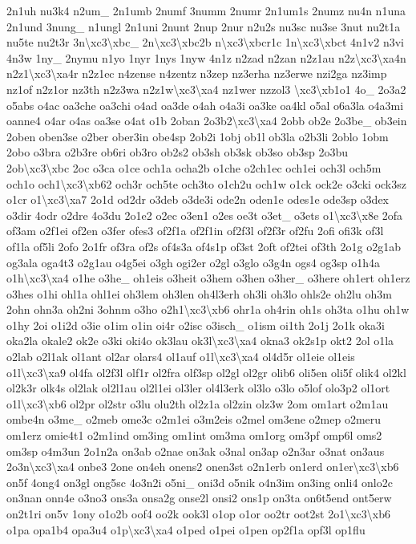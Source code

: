 {2n1uh nu3k4 n2um\-\_\- 2n1umb 2numf 3numm 2numr 2n1um1s 2numz nu4n n1una 2n1und 3nung\-\_\- n1ungl 2n1uni 2nunt 2nup 2nur n2u2s nu3sc nu3se 3nut nu2t1a nu5te nu2t3r 3n\textbackslash{}xc3\textbackslash{}xbc\-\_\- 2n\textbackslash{}xc3\textbackslash{}xbc2b n\textbackslash{}xc3\textbackslash{}xbcr1c 1n\textbackslash{}xc3\textbackslash{}xbct 4n1v2 n3vi 4n3w 1ny\-\_\- 2nymu n1yo 1nyr 1nys 1nyw 4n1z n2zad n2zan n2z1au n2z\textbackslash{}xc3\textbackslash{}xa4n n2z1\textbackslash{}xc3\textbackslash{}xa4r n2z1ec n4zense n4zentz n3zep nz3erha nz3erwe nzi2ga nz3imp nz1of n2z1or nz3th n2z3wa n2z1w\textbackslash{}xc3\textbackslash{}xa4 nz1wer nzzol3 \textbackslash{}xc3\textbackslash{}xb1o1 4o\-\_\- 2o3a2 o5abs o4ac oa3che oa3chi o4ad oa3de o4ah o4a3i oa3ke oa4kl o5al o6a3la o4a3mi oanne4 o4ar o4as oa3se o4at o1b 2oban 2o3b2\textbackslash{}xc3\textbackslash{}xa4 2obb ob2e 2o3be\-\_\- ob3ein 2oben oben3se o2ber ober3in obe4sp 2ob2i 1obj ob1l ob3la o2b3li 2oblo 1obm 2obo o3bra o2b3re ob6ri ob3ro ob2s2 ob3sh ob3sk ob3so ob3sp 2o3bu 2ob\textbackslash{}xc3\textbackslash{}xbc 2oc o3ca o1ce och1a ocha2b o1che o2ch1ec och1ei och3l och5m och1o och1\textbackslash{}xc3\textbackslash{}xb62 och3r och5te och3to o1ch2u och1w o1ck ock2e o3cki ock3sz o1cr o1\textbackslash{}xc3\textbackslash{}xa7 2o1d od2dr o3deb o3de3i ode2n oden1e odes1e ode3sp o3dex o3dir 4odr o2dre 4o3du 2o1e2 o2ec o3en1 o2es oe3t o3et\-\_\- o3ets o1\textbackslash{}xc3\textbackslash{}x8e 2ofa of3am o2f1ei of2en o3fer ofes3 of2f1a of2f1in of2f3l of2f3r of2fu 2ofi ofi3k of3l of1la of5li 2ofo 2o1fr of3ra of2s of4s3a of4s1p of3st 2oft of2tei of3th 2o1g o2g1ab og3ala oga4t3 o2g1au o4g5ei o3gh ogi2er o2gl o3glo o3g4n ogs4 og3sp o1h4a o1h\textbackslash{}xc3\textbackslash{}xa4 o1he o3he\-\_\- oh1eis o3heit o3hem o3hen o3her\-\_\- o3here oh1ert oh1erz o3hes o1hi ohl1a ohl1ei oh3lem oh3len oh4l3erh oh3li oh3lo ohls2e oh2lu oh3m 2ohn ohn3a oh2ni 3ohnm o3ho o2h1\textbackslash{}xc3\textbackslash{}xb6 ohr1a oh4rin oh1s oh3ta o1hu oh1w o1hy 2oi o1i2d o3ie o1im o1in oi4r o2isc o3isch\-\_\- o1ism oi1th 2o1j 2o1k oka3i oka2la okale2 ok2e o3ki oki4o ok3lau ok3l\textbackslash{}xc3\textbackslash{}xa4 okna3 ok2s1p okt2 2ol o1la o2lab o2l1ak ol1ant ol2ar olars4 ol1auf o1l\textbackslash{}xc3\textbackslash{}xa4 ol4d5r ol1eie ol1eis o1l\textbackslash{}xc3\textbackslash{}xa9 ol4fa ol2f3l olf1r ol2fra olf3sp ol2gl ol2gr olib6 oli5en oli5f olik4 ol2kl ol2k3r olk4s ol2lak ol2l1au ol2l1ei ol3ler ol4l3erk ol3lo o3lo o5lof olo3p2 ol1ort o1l\textbackslash{}xc3\textbackslash{}xb6 ol2pr ol2str o3lu olu2th ol2z1a ol2zin olz3w 2om om1art o2m1au ombe4n o3me\-\_\- o2meb ome3c o2m1ei o3m2eis o2mel om3ene o2mep o2meru om1erz omie4t1 o2m1ind om3ing om1int om3ma om1org om3pf omp6l oms2 om3sp o4m3un 2o1n2a on3ab o2nae on3ak o3nal on3ap o2n3ar o3nat on3aus 2o3n\textbackslash{}xc3\textbackslash{}xa4 onbe3 2one on4eh onens2 onen3st o2n1erb on1erd on1er\textbackslash{}xc3\textbackslash{}xb6 on5f 4ong4 on3gl ong5sc 4o3n2i o5ni\-\_\- oni3d o5nik o4n3im on3ing onli4 onlo2c on3nan onn4e o3no3 ons3a onsa2g onse2l onsi2 ons1p on3ta on6t5end ont5erw on2t1ri on5v 1ony o1o2b oof4 oo2k ook3l o1op o1or oo2tr oot2st 2o1\textbackslash{}xc3\textbackslash{}xb6 o1pa opa1b4 opa3u4 o1p\textbackslash{}xc3\textbackslash{}xa4 o1ped o1pei o1pen op2f1a opf3l op1flu }
